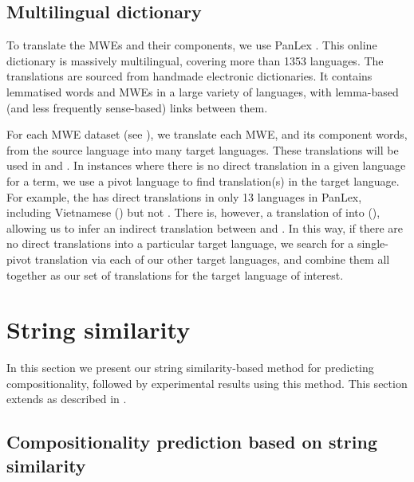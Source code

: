 \documentclass[output=paper
,modfonts
,nonflat]{langsci/langscibook}
\begin{document}
\subsection{Multilingual dictionary\label{sec:multilingdict}}

To translate the MWEs and their components, we use PanLex
\citep{baldwin2010}. This online dictionary is massively multilingual,
covering more than 1353 languages. The translations are sourced from
handmade electronic dictionaries. It contains lemmatised words and
MWEs in a large variety of languages, with lemma-based (and less
frequently sense-based) links between them. 

For each MWE dataset (see ), we translate each
MWE, and its component words, from the source language into many
target languages. These translations will be used in
 and . In instances where
there is no direct translation in a given language for a term, we use
a pivot language to find translation(s) in the target language. For
example, the    has direct
translations in only 13 languages in PanLex, including Vietnamese
() but not . There is, however, a
translation of  into 
(), allowing us to infer an indirect translation
between  and . In this way,
if there are no direct translations into a particular target language,
we search for a single-pivot translation via each of our other target
languages, and combine them all together as our set of translations
for the target language of interest.


\section{String similarity\label{sec:stringsim}}

In this section we present our string similarity-based method for
predicting compositionality, followed by experimental results using
this method. This section extends \cite{salehi2013} as described in
.


\subsection{Compositionality prediction based on string similarity\label{sec:stringsimmethod}}
\end{document}
